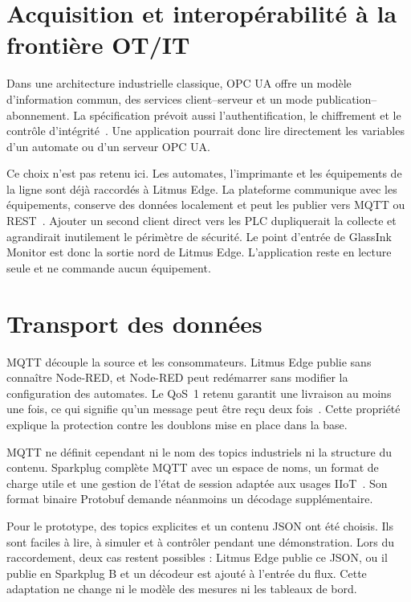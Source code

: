 \section{Acquisition et interopérabilité à la frontière OT/IT}

Dans une architecture industrielle classique, OPC UA offre un modèle
d'information commun, des services client--serveur et un mode
publication--abonnement. La spécification prévoit aussi l'authentification,
le chiffrement et le contrôle d'intégrité~\cite{opcua}. Une application
pourrait donc lire directement les variables d'un automate ou d'un serveur
OPC UA.

Ce choix n'est pas retenu ici. Les automates, l'imprimante et les équipements
de la ligne sont déjà raccordés à Litmus Edge. La plateforme communique avec
les équipements, conserve des données localement et peut les publier vers
MQTT ou REST~\cite{litmusedge}. Ajouter un second client direct vers les PLC
dupliquerait la collecte et agrandirait inutilement le périmètre de sécurité.
Le point d'entrée de GlassInk Monitor est donc la sortie nord de Litmus Edge.
L'application reste en lecture seule et ne commande aucun équipement.

\section{Transport des données}

MQTT découple la source et les consommateurs. Litmus Edge publie sans connaître
Node-RED, et Node-RED peut redémarrer sans modifier la configuration des
automates. Le QoS~1 retenu garantit une livraison au moins une fois, ce qui
signifie qu'un message peut être reçu deux fois~\cite{mqtt5}. Cette propriété
explique la protection contre les doublons mise en place dans la base.

MQTT ne définit cependant ni le nom des topics industriels ni la structure du
contenu. Sparkplug complète MQTT avec un espace de noms, un format de charge
utile et une gestion de l'état de session adaptée aux usages
IIoT~\cite{sparkplug}. Son format binaire Protobuf demande néanmoins un
décodage supplémentaire.

Pour le prototype, des topics explicites et un contenu JSON ont été choisis.
Ils sont faciles à lire, à simuler et à contrôler pendant une démonstration.
Lors du raccordement, deux cas restent possibles : Litmus Edge publie ce JSON,
ou il publie en Sparkplug B et un décodeur est ajouté à l'entrée du flux.
Cette adaptation ne change ni le modèle des mesures ni les tableaux de bord.

